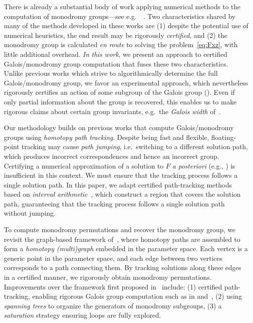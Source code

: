 \documentclass[11pt]{amsart}
\let\oldtextit\textit
\renewcommand\emph[1]{\oldtextit{\color{blue}#1}}
\theoremstyle{definition}
\theoremstyle{remark}
\begin{document}
There is already a substantial body of work applying numerical methods to the computation of monodromy groups---see e.g.~~\cite{brazelton2024monodromy,duff2022galois,duff2023using,duff2025galois,pichon2025galois,hauenstein2018numerical,leysot,edwards2026computing,granboulan1996construction}.
Two characteristics shared by many of the methods developed in these works are (1) despite the potential use of numerical heuristics, the end result may be rigorously \textit{certified}, and (2) the monodromy group is calculated \textit{en route} to solving the problem~\eqref{eq:Fxz}, with little additional overhead.
\textit{In this work}, we present an approach to certified Galois/monodromy group computation that fuses these two characteristics.
Unlike previous works which strive to algorithmically determine the full Galois/monodromy group, we favor an experimental approach, which nevertheless rigorously certifies an action of some subgroup of the Galois group (). 
Even if only partial information about the group is recovered, this enables us to make rigorous claims about certain group invariants, e.g.~the \emph{Galois width} of~\cite{duff2025galois}.

Our methodology builds on previous works that compute Galois/monodromy groups using \emph{homotopy path tracking}. Despite being fast and flexible, floating-point tracking may cause \emph{path jumping}, i.e.\  switching to a different solution path, which produces incorrect correspondences and hence an incorrect group. Certifying a numerical approximation of a solution to $F$ \textit{a posteriori} (e.g., \cite{breiding2020certifying,burr2019effective,hauenstein2012algorithm,lee2019certifying,lee2024effective,krawczyk1969newton}) is insufficient in this context. We must ensure that the tracking process follows a single solution path. 
In this paper, we adapt certified path-tracking methods based on \emph{interval arithmetic}~\cite{doi:10.1137/0731048,martin2013certified,van2011reliable,xu2018approach,duff2024certified,guillemot2024validated,guillemot2025certified}, which construct a region that covers the solution path, guaranteeing that the tracking process follows a single solution path without jumping.

To compute monodromy permutations and recover the monodromy group, we revisit the graph-based framework of~\cite{duff2019solving}, where homotopy paths are assembled to form a \emph{homotopy (multi)graph} embedded in the parameter space. Each vertex is a generic point in the parameter space, and each edge between two vertices corresponds to a path connecting them. By tracking solutions along these edges in a certified manner, we rigorously obtain monodromy permutations.
Improvements over the framework first proposed in~\cite{duff2019solving} include: (1) certified path-tracking, enabling rigorous  Galois group computation  such as in  and~, (2) using \emph{spanning trees} to organize the generators of monodromy subgroups, (3) a \emph{saturation} strategy ensuring loops are fully explored. 
\end{document}
